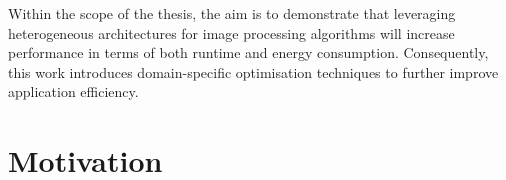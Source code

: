 Within the scope of the thesis, the aim is to demonstrate that leveraging heterogeneous architectures for image processing algorithms will increase performance in terms of both runtime and energy consumption. Consequently, this work introduces domain-specific optimisation techniques to further improve application efficiency. 






\section{Motivation}



